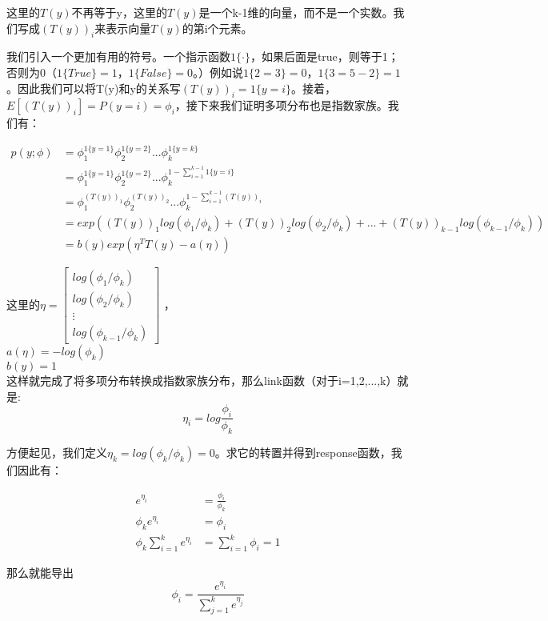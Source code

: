 \documentclass[UTF8]{ctexart}
\begin{document}
这里的$T(y)$不再等于y，这里的$T(y)$是一个k-1维的向量，而不是一个实数。我们写成$(T(y))_{i}$来表示向量$T(y)$的第i个元素。

我们引入一个更加有用的符号。一个指示函数$1\{ \cdot \}$，如果后面是true，则等于1；否则为0（$1\{ True \}=1$，$1\{ False \}=0$。）例如说$1\{ 2=3\}=0$，$1\{ 3=5-2 \}=1$。因此我们可以将T(y)和y的关系写$(T(y))_{i}=1\{ y=i\}$。接着，$E[(T(y))_{i}]=P(y=i)=\phi_{i}$，接下来我们证明多项分布也是指数家族。我们有：

\begin{align*}
p(y;\phi) & = \phi_{1}^{1\{y=1\}}  \phi_{2}^{1\{y=2\}} ... \phi_{k}^{1\{y=k\}}  \\
& = \phi_{1}^{1\{y=1\}}  \phi_{2}^{1\{y=2\}} ... \phi_{k}^{1-\sum_{i=1}^{k-1} 1 \{ y=i\}}\\
& = \phi_{1}^{(T(y))_{1}}  \phi_{2}^{(T(y))_{2}} ... \phi_{k}^{1-\sum_{i=1}^{k-1} (T(y))_{i}}  \\
& = exp( (T(y))_{1}log(\phi_{1}/\phi_{k}) + (T(y))_{2}log(\phi_{2}/\phi_{k}) +...+(T(y))_{k-1}log(\phi_{k-1}/\phi_{k})         )\\
& = b(y)exp(\eta^{T}T(y)-a(\eta))
\end{align*}

这里的$ \eta = \begin{bmatrix} log(\phi_{1}/\phi_{k}) \\log(\phi_{2}/\phi_{k}) \\ \vdots \\log(\phi_{k-1}/\phi_{k}) \end{bmatrix}$ ，\\
 $a(\eta) = - log(\phi_{k})$ \\
 $ b(y) = 1$\\

这样就完成了将多项分布转换成指数家族分布，那么link函数（对于i=1,2,...,k）就是:\[ \eta_{i} = log\frac{\phi_{i}}{\phi_{k}} \]

方便起见，我们定义$\eta_{k} =  log(\phi_{k}/\phi_{k}) =0 $。求它的转置并得到response函数，我们因此有：

\begin{align*}
e^{\eta_{i}} & = \frac{\phi_{i}}{\phi_{k}}\\
\phi_{k} e^{\eta_{i}} & =  \phi_{i} \\
\phi_{k} \sum_{i=1}^{k} e^{\eta_{i}} & = \sum_{i=1}^{k}\phi_{i} =1 
\end{align*} 

那么就能导出\[ \phi_{i} =\frac{e^{\eta_{i}}}{\sum_{j=1}^{k} e^{\eta_{j}} }\]
\end{document}
